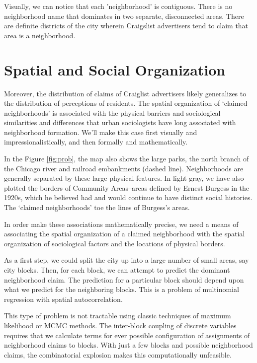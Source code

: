 \documentclass[12pt,letter]{article}\usepackage[]{graphicx}\usepackage[]{color}
\begin{document}
Visually, we can notice that each 'neighborhood' is contiguous. There
is no neighborhood name that dominates in two separate, disconnected
areas. There are definite districts of the city wherein Craigslist
advertisers tend to claim that area is a neighborhood.

\section*{Spatial and Social Organization}

Moreover, the distribution of claims of Craiglist advertisers likely
generalizes to the distribution of perceptions of residents. The
spatial organization of `claimed neighborhoods' is associated with the
physical barriers and sociological similarities and differences that
urban sociologists have long associated with neighborhood
formation. We'll make this case first visually and
impressionalistically, and then formally and mathematically.

In the Figure \ref{fig:prob}, the map also shows the large parks, the
north branch of the Chicago river and railroad embankments (dashed
line). Neighborhoods are generally separated by these large physical
features. In light gray, we have also plotted the borders of Community
Areas--areas defined by Ernest Burgess in the 1920s, which he believed
had and would continue to have distinct social histories. The `claimed
neighborhoods' toe the lines of Burgess's areas.

In order make these associations mathematically precise, we need a
means of associating the spatial organization of a claimed
neighborhood with the spatial organization of sociological factors and
the locations of physical borders. 

As a first step, we could split the city up into a large number of
small areas, say city blocks. Then, for each block, we can attempt to
predict the dominant neighborhood claim. The prediction for a
particular block should depend upon what we predict for the
neighboring blocks. This is a problem of multinomial regression with
spatial autocorrelation. 

This type of problem is not tractable using classic techniques of
maximum likelihood or MCMC methods. The inter-block coupling of
discrete variables requires that we calculate terms for ever possible
configuration of assignments of neighborhood claims to blocks. With
just a few blocks and possible neighborhood claims, the combinatorial
explosion makes this computationally unfeasible.
\end{document}
